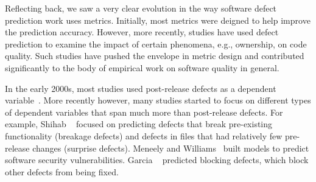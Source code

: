 
Reflecting back, we saw a very clear evolution in the way software defect prediction work uses metrics. Initially, most metrics were deigned to help improve the prediction accuracy. However, more recently, studies have used defect prediction to examine the impact of certain phenomena, e.g., ownership, on code quality. Such studies have pushed the envelope in metric design and contributed significantly to the body of empirical work on software quality in general.

In the early 2000s, most studies used post-release defects as a dependent variable~\cite{Briand2002TSE,Denaro2002ICSE}. More recently however, many studies started to focus on different types of dependent variables that span much more than post-release defects. For example, Shihab \ea ~\cite{Shihab2011FSE} focused on predicting defects that break pre-existing functionality (breakage defects) and defects in files that had relatively few pre-release changes (surprise defects). Meneely and Williams~\cite{Meneely2010ESEM} built models to predict software security vulnerabilities. Garcia \ea~\cite{Garcia2014MSR} predicted blocking defects, which block other defects from being fixed. 



